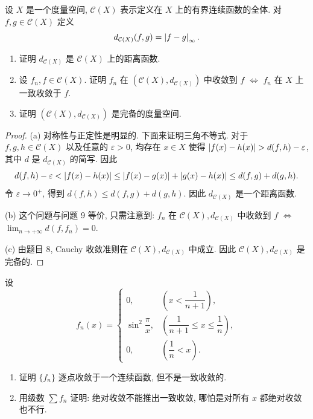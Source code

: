 \documentclass{article}
\begin{document}
\begin{problem}
设 $X$ 是一个度量空间, $\mathcal{C}(X)$ 表示定义在 $X$ 上的有界连续函数的全体. 对 $f,g\in\mathcal{C}(X)$ 定义
\[
d_{\mathcal{C}(X)}(f,g)=\left|f-g\right|_\infty.
\]
\begin{enumerate}[label=(\alph*)]
\item 证明 $d_{\mathcal{C}(X)}$ 是 $\mathcal{C}(X)$ 上的距离函数.
\item 设 $f_n,f\in\mathcal{C}(X)$. 证明 $f_n$ 在 $(\mathcal{C}(X),d_{\mathcal{C}(X)})$ 中收敛到 $f$ $\Longleftrightarrow$ $f_n$ 在 $X$ 上一致收敛于 $f$.
\item 证明 $(\mathcal{C}(X),d_{\mathcal{C}(X)})$ 是完备的度量空间.
\end{enumerate}
\end{problem}

\begin{proof}
  (a) 对称性与正定性是明显的. 下面来证明三角不等式. 对于 \( f,g,h\in \mathcal{C}(X) \) 以及任意的 \( \varepsilon>0 \), 均存在 \( x\in X \) 使得 \( \abs{f(x)-h(x)}>d(f,h)-\varepsilon \), 其中 \( d \) 是 \( d_{\mathcal{C}(X)} \) 的简写. 因此
  \[ d(f,h)-\varepsilon
  <\left|f(x)-h(x)\right|
  \le\left|f(x)-g(x)\right|+\left|g(x)-h(x)\right|
  \le d(f,g)+d(g,h). \]
  令 \( \varepsilon\to 0^+ \), 得到 \( d(f,h)\le d(f,g)+d(g,h) \). 因此 \( d_{\mathcal{C}(X)} \) 是一个距离函数.

  (b) 这个问题与问题 9 等价, 只需注意到: \( f_n \) 在 \( \mathcal{C}(X),d_{\mathcal{C}(X)} \) 中收敛到 \( f \) \( \Longleftrightarrow \) \( \lim_{n\to+\infty}d(f,f_n)=0 \). 

  (c) 由题目 8, Cauchy 收敛准则在 \( \mathcal{C}(X),d_{\mathcal{C}(X)} \) 中成立. 因此 \( \mathcal{C}(X),d_{\mathcal{C}(X)} \) 是完备的.
\end{proof}



\begin{problem}
设
\[
f_n(x)=
\begin{cases}
0, & \left(x<\dfrac{1}{n+1}\right), \\
\sin^2\dfrac{\pi}{x}, & \left(\dfrac{1}{n+1}\le x\le \dfrac{1}{n}\right), \\
0, & \left(\dfrac{1}{n}<x\right).
\end{cases}
\]
\begin{enumerate}[label=(\alph*)]
\item 证明 $\{f_n\}$ 逐点收敛于一个连续函数, 但不是一致收敛的.
\item 用级数 $\sum f_n$ 证明: 绝对收敛不能推出一致收敛, 哪怕是对所有 $x$ 都绝对收敛也不行.
\end{enumerate}
\end{problem}
\end{document}
